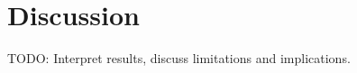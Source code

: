 \section{Discussion}
\label{sec:discussion}

TODO: Interpret results, discuss limitations and implications.
